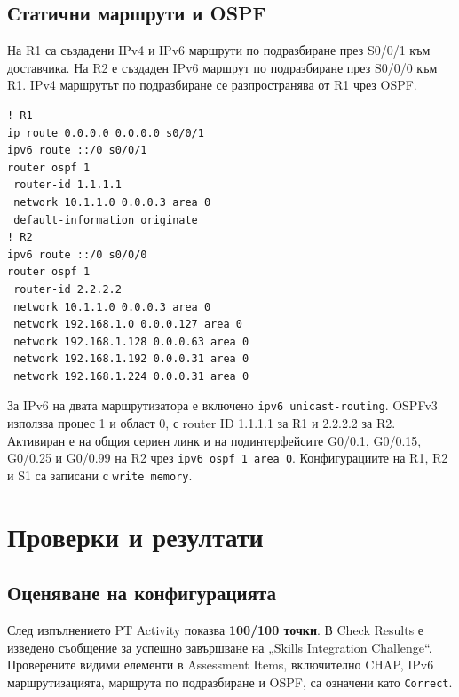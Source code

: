 \documentclass[12pt]{article}
\begin{document}
\subsection{Статични маршрути и OSPF}
На R1 са създадени IPv4 и IPv6 маршрути по подразбиране през S0/0/1 към доставчика. На R2 е създаден IPv6 маршрут по подразбиране през S0/0/0 към R1. IPv4 маршрутът по подразбиране се разпространява от R1 чрез OSPF.
\begin{lstlisting}
! R1
ip route 0.0.0.0 0.0.0.0 s0/0/1
ipv6 route ::/0 s0/0/1
router ospf 1
 router-id 1.1.1.1
 network 10.1.1.0 0.0.0.3 area 0
 default-information originate
! R2
ipv6 route ::/0 s0/0/0
router ospf 1
 router-id 2.2.2.2
 network 10.1.1.0 0.0.0.3 area 0
 network 192.168.1.0 0.0.0.127 area 0
 network 192.168.1.128 0.0.0.63 area 0
 network 192.168.1.192 0.0.0.31 area 0
 network 192.168.1.224 0.0.0.31 area 0
\end{lstlisting}
За IPv6 на двата маршрутизатора е включено \texttt{ipv6 unicast-routing}. OSPFv3 използва процес 1 и област 0, с router ID 1.1.1.1 за R1 и 2.2.2.2 за R2. Активиран е на общия сериен линк и на подинтерфейсите G0/0.1, G0/0.15, G0/0.25 и G0/0.99 на R2 чрез \texttt{ipv6 ospf 1 area 0}. Конфигурациите на R1, R2 и S1 са записани с \texttt{write memory}.

\section{Проверки и резултати}
\subsection{Оценяване на конфигурацията}
След изпълнението PT Activity показва \textbf{100/100 точки}. В Check Results е изведено съобщение за успешно завършване на „Skills Integration Challenge“. Проверените видими елементи в Assessment Items, включително CHAP, IPv6 маршрутизацията, маршрута по подразбиране и OSPF, са означени като \texttt{Correct}.

\end{document}
